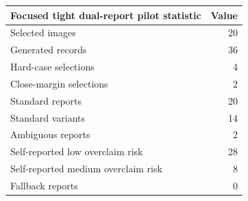 \begin{tabular}{lr}
\toprule
Focused tight dual-report pilot statistic & Value \\
\midrule
Selected images & 20 \\
Generated records & 36 \\
Hard-case selections & 4 \\
Close-margin selections & 2 \\
Standard reports & 20 \\
Standard variants & 14 \\
Ambiguous reports & 2 \\
Self-reported low overclaim risk & 28 \\
Self-reported medium overclaim risk & 8 \\
Fallback reports & 0 \\
\bottomrule
\end{tabular}
